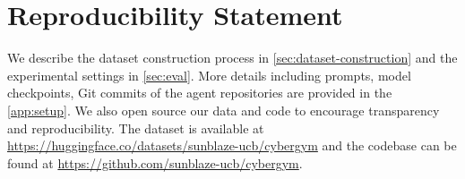 \section*{Reproducibility Statement}
We describe the dataset construction process in \cref{sec:dataset-construction} and the experimental settings in \cref{sec:eval}.
More details including prompts, model checkpoints, Git commits of the agent repositories are provided in the \cref{app:setup}.
We also open source our data and code to encourage transparency and reproducibility. The dataset is available at \url{https://huggingface.co/datasets/sunblaze-ucb/cybergym} and the codebase can be found at \url{https://github.com/sunblaze-ucb/cybergym}.

